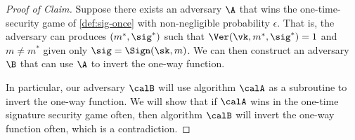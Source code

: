 \begin{proof}[Proof of Claim]
Suppose there exists an adversary $\A$ that wins the 
one-time-security game of \cref{def:sig-once} with non-negligible probability $\epsilon$.
That is, the adversary can produces $(m^*, \sig^*)$ such that $\Ver(\vk, m^*, \sig^*) = 1$ and $m \neq m^*$ given only $\sig = \Sign(\sk, m)$.
We can then construct an adversary $\B$ that can use $\A$ to 
invert the one-way function.


In particular, our adversary $\calB$ will use algorithm $\calA$
as a subroutine to invert the one-way function.
We will show that if $\calA$ wins in the one-time signature security
game often, then algorithm $\calB$ will invert the one-way function
often, which is a contradiction.


\end{proof}
